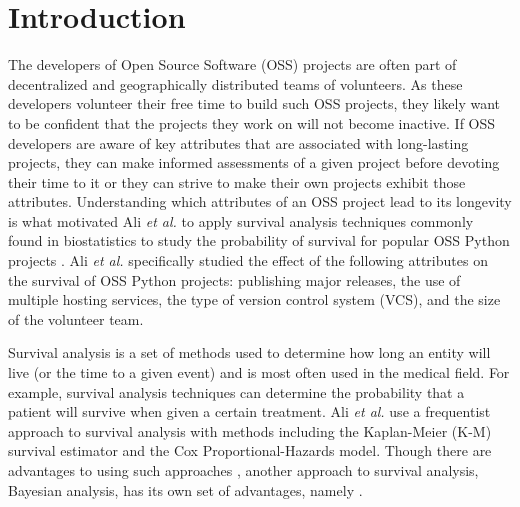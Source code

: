 \documentclass[acmconf]{acmart}
\begin{document}


\maketitle

\section{Introduction}
The developers of Open Source Software (OSS) projects are often part of decentralized and geographically distributed teams of volunteers.
As these developers volunteer their free time to build such OSS projects, they likely want to be confident that the projects they work on will not become inactive.
If OSS developers are aware of key attributes that are associated with long-lasting projects, they can make informed assessments of a given project before devoting their time to it or they can strive to make their own projects exhibit those attributes.
Understanding which attributes of an OSS project lead to its longevity is what motivated Ali \emph{et al.} to apply survival analysis techniques commonly found in biostatistics to study the probability of survival for popular OSS Python projects \cite{ali2020cheating}.
Ali \emph{et al.} specifically studied the effect of the following attributes on the survival of OSS Python projects: publishing major releases, the use of multiple hosting services, the type of version control system (VCS), and the size of the volunteer team.

Survival analysis is a set of methods used to determine how long an entity will live (or the time to a given event) and is most often used in the medical field.
For example, survival analysis techniques can determine the probability that a patient will survive when given a certain treatment. 
Ali \emph{et al.} use a frequentist approach to survival analysis with methods including the Kaplan-Meier (K-M) survival estimator and the Cox Proportional-Hazards model.
Though there are advantages to using such approaches , another approach to survival analysis, Bayesian analysis, has its own set of advantages, namely .
\end{document}
